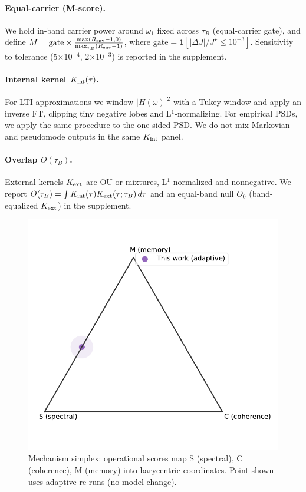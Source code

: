\documentclass[11pt,letterpaper]{article}
\begin{document}
\paragraph*{Equal-carrier (M-score).} We hold in-band carrier power around $\omega_1$ fixed across $\tau_B$ (equal-carrier gate), and define $M=\mathrm{gate}\times \frac{\max(R_{\rm env}-1,0)}{\max_{\tau_B}(R_{\rm env}-1)}$, where $\mathrm{gate}=\mathbf{1}[|\Delta J|/J^\star\le 10^{-3}]$. Sensitivity to tolerance (5$\times$10$^{-4}$, 2$\times$10$^{-3}$) is reported in the supplement.

\paragraph*{Internal kernel $K_{\rm int}(\tau)$.} For LTI approximations we window $|H(\omega)|^2$ with a Tukey window and apply an inverse FT, clipping tiny negative lobes and L$^1$-normalizing. For empirical PSDs, we apply the same procedure to the one-sided PSD. We do not mix Markovian and pseudomode outputs in the same $K_{\rm int}$ panel.

\paragraph*{Overlap $O(\tau_B)$.} External kernels $K_{\rm ext}$ are OU or mixtures, L$^1$-normalized and nonnegative. We report $O(\tau_B)=\int K_{\rm int}(\tau)K_{\rm ext}(\tau;\tau_B)\,d\tau$ and an equal-band null $O_0$ (band-equalized $K_{\rm ext}$) in the supplement.

\begin{figure}[t]
\centering
\includegraphics[width=0.56\linewidth]{figG_mechanism_simplex.pdf}
\caption{Mechanism simplex: operational scores map S (spectral), C (coherence), M (memory) into barycentric coordinates. Point shown uses adaptive re-runs (no model change).}
\end{figure}
\end{document}
